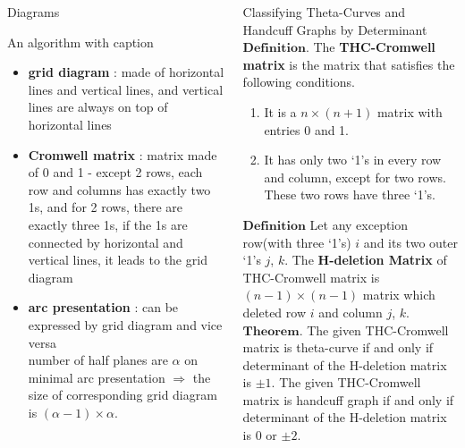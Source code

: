 \documentclass[final]{beamer}
\begin{document}
\begin{frame}[t]
\begin{columns}[t]
\begin{block}{Diagrams}
    \begin{Diagrams}
      \caption{An algorithm with caption}\label{alg:cap}
      \begin{itemize} 
        \item \textbf{grid diagram} : made of horizontal lines and vertical lines, and vertical lines are always on top of horizontal lines
        \item \textbf{Cromwell matrix} : matrix made of 0 and 1 - except 2 rows, each row and columns has exactly two 1s, and for 2 rows, there are exactly three 1s, if the 1s are connected by horizontal and vertical lines, it leads to the grid diagram
        \item \textbf{arc presentation} : can be expressed by grid diagram and vice versa \\ number of half planes are $\alpha$ on minimal arc presentation $\Rightarrow$ the size of corresponding grid diagram is $(\alpha - 1) \times \alpha$.\\
      \end{itemize} 
    \end{Diagrams}

  \end{block}
  \begin{block}{Classifying Theta-Curves and Handcuff Graphs by Determinant}
    $\mathbf{Definition.}$ The \textbf{THC-Cromwell matrix} is the matrix that satisfies the following conditions.
    \begin{enumerate}
      \item It is a $n\times(n+1)$ matrix with entries 0 and 1.
      \item It has only two `1's in every row and column, except for two rows. These two rows have three `1's.
    \end{enumerate}
    $\mathbf{Definition}$ Let any exception row(with three `1's) $i$ and its two outer `1's $j$, $k$.
    The \textbf{H-deletion Matrix} of THC-Cromwell matrix is $(n-1)\times(n-1)$ matrix which deleted row $i$ and column $j$, $k$.\\
    $\mathbf{Theorem.}$ The given THC-Cromwell matrix is theta-curve if and only if determinant of the H-deletion matrix is $\pm 1$.
    The given THC-Cromwell matrix is handcuff graph if and only if determinant of the H-deletion matrix is $0$ or $\pm 2$.\\
  \end{block}
\end{columns}


\end{frame}
\end{document}
